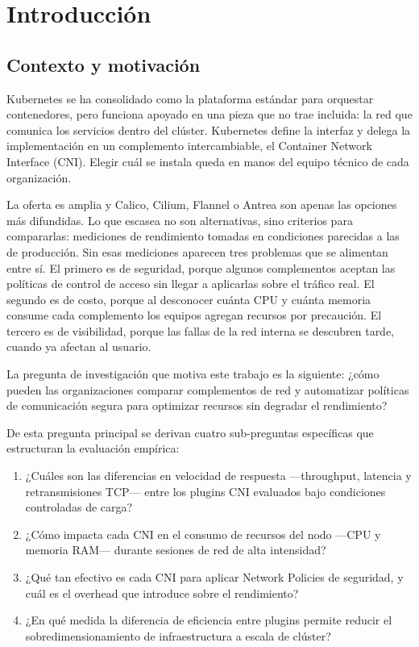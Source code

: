\chapter{Introducción} \label{sec:Introduccion}

\section{Contexto y motivación}

Kubernetes se ha consolidado como la plataforma estándar para orquestar contenedores, pero funciona apoyado en una pieza que no trae incluida: la red que comunica los servicios dentro del clúster. Kubernetes define la interfaz y delega la implementación en un complemento intercambiable, el Container Network Interface (CNI). Elegir cuál se instala queda en manos del equipo técnico de cada organización.

La oferta es amplia y Calico, Cilium, Flannel o Antrea son apenas las opciones más difundidas. Lo que escasea no son alternativas, sino criterios para compararlas: mediciones de rendimiento tomadas en condiciones parecidas a las de producción. Sin esas mediciones aparecen tres problemas que se alimentan entre sí. El primero es de seguridad, porque algunos complementos aceptan las políticas de control de acceso sin llegar a aplicarlas sobre el tráfico real. El segundo es de costo, porque al desconocer cuánta CPU y cuánta memoria consume cada complemento los equipos agregan recursos por precaución. El tercero es de visibilidad, porque las fallas de la red interna se descubren tarde, cuando ya afectan al usuario.

La pregunta de investigación que motiva este trabajo es la siguiente: ¿cómo pueden las organizaciones comparar complementos de red y automatizar políticas de comunicación segura para optimizar recursos sin degradar el rendimiento?

De esta pregunta principal se derivan cuatro sub-preguntas específicas que estructuran la evaluación empírica:

\begin{enumerate}
    \item ¿Cuáles son las diferencias en velocidad de respuesta ---throughput, latencia y retransmisiones TCP--- entre los plugins CNI evaluados bajo condiciones controladas de carga?
    \item ¿Cómo impacta cada CNI en el consumo de recursos del nodo ---CPU y memoria RAM--- durante sesiones de red de alta intensidad?
    \item ¿Qué tan efectivo es cada CNI para aplicar Network Policies de seguridad, y cuál es el overhead que introduce sobre el rendimiento?
    \item ¿En qué medida la diferencia de eficiencia entre plugins permite reducir el sobredimensionamiento de infraestructura a escala de clúster?
\end{enumerate}

